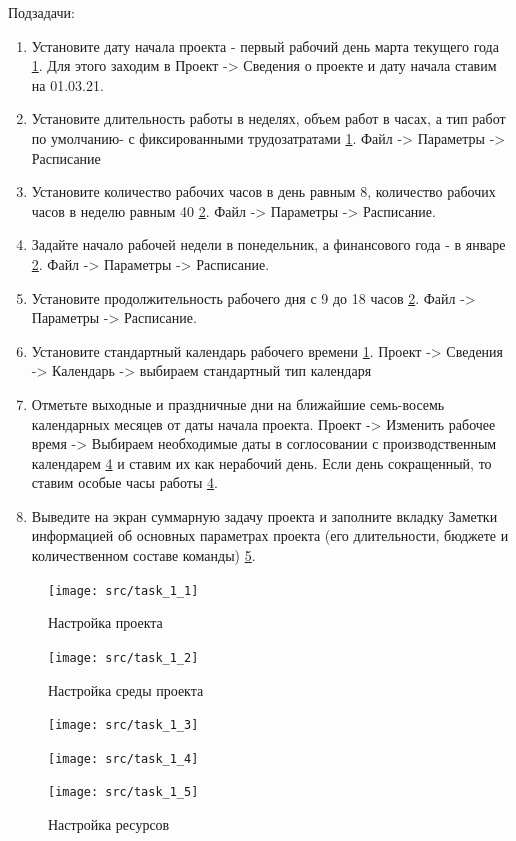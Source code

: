 Подзадачи:
\begin{enumerate}
	\item Установите дату начала проекта - первый рабочий день марта текущего года \ref{fig:task11}.
	Для этого заходим в Проект -> Сведения о проекте и дату начала ставим на 01.03.21.
	\item Установите длительность работы в неделях, объем работ в часах, а тип работ по умолчанию- с фиксированными трудозатратами \ref{fig:task11}. Файл -> Параметры -> Расписание
	\item Установите количество рабочих часов в день равным 8, количество рабочих часов в неделю равным 40 \ref{fig:task12}. 
	Файл -> Параметры -> Расписание.
	\item Задайте начало рабочей недели в понедельник, а финансового года - в январе \ref{fig:task12}. 
	Файл -> Параметры -> Расписание. 
	\item Установите продолжительность рабочего дня с 9 до 18 часов \ref{fig:task12}.
	Файл -> Параметры -> Расписание.
	\item Установите стандартный календарь рабочего времени \ref{fig:task11}.
	Проект -> Сведения -> Календарь -> выбираем стандартный тип календаря
	\item Отметьте выходные и праздничные дни на ближайшие семь-восемь календарных месяцев от даты начала проекта.
	Проект -> Изменить рабочее время -> Выбираем необходимые даты в соглосовании с производственным календарем \ref{fig:task14} и ставим их как нерабочий день.
	Если день сокращенный, то ставим особые часы работы \ref{fig:task14}.
	\item Выведите на экран суммарную задачу проекта и заполните вкладку Заметки информацией об основных параметрах проекта (его длительности, бюджете и	количественном составе команды) \ref{fig:task15}.
\end{enumerate}
\begin{figure}[H]
	\centering
	\texttt{[image: src/task\_1\_1]}
	\caption{Настройка проекта}
	\label{fig:task11}
\end{figure}
\begin{figure}[H]
	\centering
	\texttt{[image: src/task\_1\_2]}
	\caption{Настройка среды проекта}
	\label{fig:task12}
\end{figure}
\begin{figure}[H]
	\centering
	\texttt{[image: src/task\_1\_3]}
	\caption[Настройка праздников и выходных дней]{}
	\label{fig:task13}
\end{figure}
\begin{figure}[H]
	\centering
	\texttt{[image: src/task\_1\_4]}
	\caption[Производственный календарь]{}
	\label{fig:task14}
\end{figure}
\begin{figure}[H]
	\centering
	\texttt{[image: src/task\_1\_5]}
	\caption{Настройка ресурсов}
	\label{fig:task15}
\end{figure}

